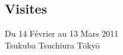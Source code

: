 \documentclass{beamer}
\begin{document}
\subsection{Visites}
\begin{frame}
\begin{center}
Du 14 Février au 13 Mars 2011\\
Tsukuba  Tsuchiura  T\=oky\=o
\end{center}
 \begin{figure}
      ~
    \end{figure}
    
\end{frame}
\end{document}
